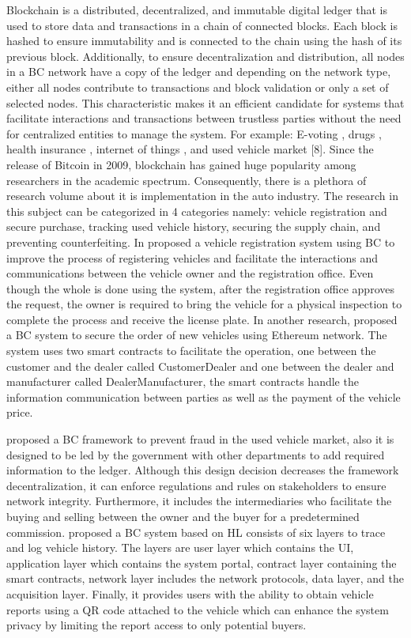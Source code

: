 Blockchain is a distributed, decentralized, and immutable digital ledger that is used to store data and transactions in a chain of connected
blocks. Each block is hashed to ensure immutability and is connected to the chain using the hash of its previous block. Additionally, to
ensure decentralization and distribution, all nodes in a BC network have a copy of the ledger and depending on the network type, either all
nodes contribute to transactions and block validation or only a set of selected nodes. This characteristic makes it an efficient candidate
for systems that facilitate interactions and transactions between trustless parties without the need for centralized entities to manage the
system. For example: E-voting
\cite{AlMaaitah2021}\cite{al2022blockchain}, drugs \cite{al2022blockchain}\cite{AlShorman2018}, health insurance \cite{Alhasan2021}, internet of things
\cite{Qatawneh2020}, and used
vehicle market [8].
Since the release of Bitcoin in 2009, blockchain has gained huge popularity among researchers in the academic spectrum. Consequently,
there is a plethora of research volume about it is implementation in the auto industry. The research in this subject can be categorized in 4
categories namely: vehicle registration and secure purchase, tracking used vehicle history, securing the supply chain, and preventing
counterfeiting. In \cite{Tran2021-fh} proposed a vehicle registration system using BC to improve the process of registering
vehicles and facilitate the interactions and communications between the vehicle owner and the registration office. Even though the whole is
done using the system, after the registration office approves the request, the owner is required to bring the vehicle for a physical
inspection to complete the process and receive the license plate. In another research, \cite{Khandelwal2021-to} proposed a BC system
to secure the order of new vehicles using Ethereum network. The system uses two smart contracts to facilitate the operation, one between the
customer and the dealer called CustomerDealer and one between the dealer and manufacturer called DealerManufacturer, the smart contracts
handle the information communication between parties as well as the payment of the vehicle price.


\cite{Yu2021-yq}
proposed a BC framework to prevent fraud in the used vehicle market, also it is designed to be led by the government with other
departments to add required information to the ledger. Although this design decision decreases the framework decentralization, it can
enforce regulations and rules on stakeholders to ensure network integrity. Furthermore, it includes the intermediaries who facilitate the
buying and selling between the owner and the buyer for a predetermined commission. \cite{Zhang2021-jo} proposed a BC system
based on HL consists of six layers to trace and log vehicle history. The layers are user layer which contains the UI, application layer
which contains the system portal, contract layer containing the smart contracts, network layer includes the network protocols, data layer,
and the acquisition layer. Finally, it provides users with the ability to obtain vehicle reports using a QR code attached to the vehicle
which can enhance the system privacy by limiting the report access to only potential buyers.


